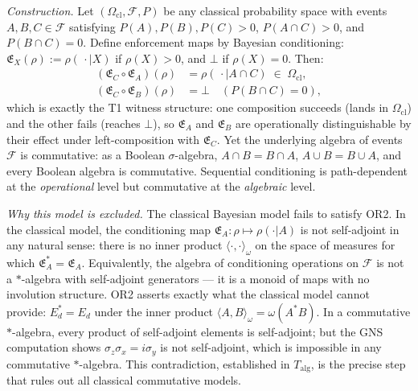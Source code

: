 \documentclass[11pt]{article}
\theoremstyle{remark}
\begin{document}
\begin{tcolorbox}[apfbox, title={Theorem T1 --- The Bridge Theorem (Order-Dependence)}]
\textit{Construction.}  Let $(\Omega_{\mathrm{cl}}, \mathcal{F}, P)$ be any classical probability space with events $A, B, C \in \mathcal{F}$ satisfying $P(A), P(B), P(C) > 0$, $P(A \cap C) > 0$, and $P(B \cap C) = 0$.  Define enforcement maps by Bayesian conditioning: $\mathfrak{E}_X(\rho) := \rho(\,\cdot \mid X)$ if $\rho(X) > 0$, and $\bot$ if $\rho(X) = 0$.  Then:
\begin{align*}
(\mathfrak{E}_C \circ \mathfrak{E}_A)(\rho) &= \rho(\,\cdot \mid A \cap C) \;\in\; \Omega_{\mathrm{cl}}, \\
(\mathfrak{E}_C \circ \mathfrak{E}_B)(\rho) &= \bot \quad (P(B \cap C) = 0),
\end{align*}
which is exactly the T1 witness structure: one composition succeeds (lands in $\Omega_{\mathrm{cl}}$) and the other fails (reaches $\bot$), so $\mathfrak{E}_A$ and $\mathfrak{E}_B$ are operationally distinguishable by their effect under left-composition with $\mathfrak{E}_C$.  Yet the underlying algebra of events $\mathcal{F}$ is commutative: as a Boolean $\sigma$-algebra, $A \cap B = B \cap A$, $A \cup B = B \cup A$, and every Boolean algebra is commutative.  Sequential conditioning is path-dependent at the \emph{operational} level but commutative at the \emph{algebraic} level.

\textit{Why this model is excluded.}  The classical Bayesian model fails to satisfy OR2.  In the classical model, the conditioning map $\mathfrak{E}_A: \rho \mapsto \rho(\cdot|A)$ is not self-adjoint in any natural sense: there is no inner product $\langle \cdot, \cdot \rangle_\omega$ on the space of measures for which $\mathfrak{E}_A^* = \mathfrak{E}_A$.  Equivalently, the algebra of conditioning operations on $\mathcal{F}$ is not a $*$-algebra with self-adjoint generators --- it is a monoid of maps with no involution structure.  OR2 asserts exactly what the classical model cannot provide: $E_d^* = E_d$ under the inner product $\langle A, B \rangle_\omega = \omega(A^*B)$.  In a commutative $*$-algebra, every product of self-adjoint elements is self-adjoint; but the GNS computation shows $\sigma_z \sigma_x = i\sigma_y$ is not self-adjoint, which is impossible in any commutative $*$-algebra.  This contradiction, established in $T_{\mathrm{alg}}$, is the precise step that rules out all classical commutative models.


\end{tcolorbox}
\end{document}
